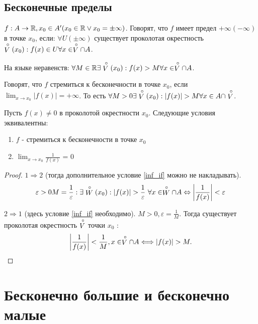 \documentclass[12pt]{report}
\begin{document}
\subsection{Бесконечные пределы}\label{ques_38}
\begin{defn}
    $f: A \to \mathbb{R}, x_0 \in A' (x_0 \in  \mathbb{R} \vee x_0 = \pm \infty)$.
    Говорят, что $f $ имеет предел $+\infty (-\infty)$ в точке $x_0$, если: $\forall U(\pm \infty)$ существует проколотая окрестность $\stackrel \circ V(x_0): f(x) \in  U \forall x \in  \stackrel \circ V \cap A$.

    На языке неравенств: $\forall M \in \mathbb{R} \exists \stackrel \circ V (x_0) : f(x) > M \forall x \in  \stackrel \circ V \cap A$.
\end{defn}
\begin{defn}
    Говорят, что $f$ стремиться к бесконечности в точке $x_0$, если $\lim_{x \to x_0} |f(x)| = +\infty$. То есть $\forall  M >0 \exists \stackrel \circ V(x_0): |f(x)| > M \forall x \in  A \cap \stackrel \circ V$.
\end{defn}
\begin{st}
    Пусть $f(x) \ne 0$ в проколотой окрестности $x_0$.\label{inf_if}
    Следующие условия эквивалентны: 
    \begin{enumerate}
        \item $f$ - стремиться к бесконечности в точке  $x_0$
	\item $\lim_{x \to  x_0} \frac{1}{f(x)}$ = 0
    \end{enumerate}
\end{st}
\begin{proof}
    $1 \Rightarrow 2$ (тогда дополнительное условие \ref{inf_if} можно не накладывать).
    $$\varepsilon  >0 M = \frac{1}{\varepsilon }: \exists \stackrel \circ W(x_0): |f(x)| > \frac{1}{\varepsilon } ~ \forall x \in  \stackrel \circ W \cap A \Leftrightarrow \left |\frac{1}{f(x)} \right |< \varepsilon $$

    $2 \Rightarrow  1$ (здесь условие \ref{inf_if} необходимо). 
    $M > 0, \varepsilon  = \frac{1}{M}$. Тогда существует проколотая окрестность $\stackrel \circ V$ точки $x_0$ :
    \[
	\left | \frac{1}{f(x)} \right | < \frac{1}{M}, x \in  \pivi V \cap A \Longleftrightarrow |f(x) |> M
    .\] 
\end{proof}
\section{Бесконечно большие и бесконечно малые}
\end{document}
